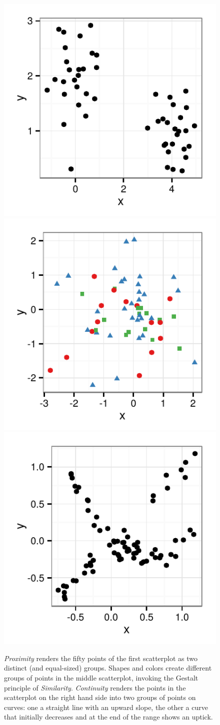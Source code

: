 \documentclass[11pt]{isuthesis}\usepackage[]{graphicx}\usepackage[]{color}
\newenvironment{knitrout}{}{} %
\begin{document}
\begin{figure}\centering
\begin{knitrout}
\color{fgcolor}

{\centering \includegraphics[width=0.32\linewidth]{Figure/FeatureHierarchy/fig-gestalt1-1} 
\includegraphics[width=0.32\linewidth]{Figure/FeatureHierarchy/fig-gestalt1-2} 
\includegraphics[width=0.32\linewidth]{Figure/FeatureHierarchy/fig-gestalt1-3} 

}



\end{knitrout}
\caption[Gestalt principles applied to statistical plots]{\label{fig:gestalt} \emph{Proximity} renders the fifty points of the first scatterplot as two distinct (and equal-sized) groups. Shapes and colors create different groups of points in the middle scatterplot, invoking the Gestalt principle of \emph{Similarity}. \emph{Continuity} renders the points in the scatterplot on the right hand side into two groups of points on curves: one a straight line with an upward slope, the other a curve that initially decreases and at the end of the range shows an uptick.} 
\end{figure}
\end{document}
